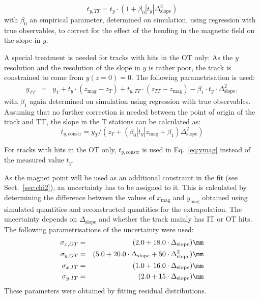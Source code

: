 \begin{equation}
t_{y,TT} = t_{y} \cdot (1 + \beta_{0} |t_{y}| \Delta_{\text{slope}}^{2})
\end{equation}
with  $\beta_{0}$ an empirical parameter, determined on simulation, 
using regression with true observables, to correct
for the effect of the bending in the magnetic field on the slope in $y$.

A special treatment is needed for tracks with hits in the OT only: As the
$y$ resolution and the resolution of the slope in $y$ is rather poor, the track
is constrained to come from $y(z=0) = 0$. The following parametrisation is used:
\begin{eqnarray}
y_{TT} & = & y_{T} + t_{y} \cdot (z_{\text{mag}} - z_{T}) + t_{y,TT} \cdot (z_{TT} - z_{\text{mag}}) - \beta_{1} \cdot t_{y} \cdot \Delta_{\text{slope}}^{2},
\end{eqnarray}
with $\beta_{1}$ again determined on simulation using regression with true observables. 
Assuming that no further correction is needed between the point of origin of the
track and TT, the slope in the T stations can be calculated as:
\begin{equation}
t_{y, \text{constr}} = y_{T} / ( z_{T} + (\beta_{0} |t_{y}| z_{\text{mag}} + \beta_{1} ) \Delta_{\text{slope}}^{2})
\end{equation}

For tracks with hits in the OT only, $t_{y, \text{constr}}$ is used in
Eq.~\ref{eq:ymag} instead of the measured value $t_{y}$.

As the magnet point will be used as an additional constraint in the \chisq fit
(see Sect.~\ref{sec:chi2}), an uncertainty has to be assigned to it. This is
calculated by determining the difference between the values of $x_{\text{mag}}$ and
$y_{\text{mag}}$ obtained using simulated quantities and reconstructed quantities for
the extrapolation. The uncertainty depends on $\Delta_{\text{slope}}$ and whether the track
mainly has IT or OT hits. The following parametrisations of the uncertainty
were used:
\begin{eqnarray}
\sigma_{x, OT} & = & (2.0 + 18.0\cdot \Delta_{\text{slope}})\mm \nonumber \\
\sigma_{y, OT} & = & (5.0 + 20.0\cdot \Delta_{\text{slope}} + 50\cdot \Delta_{\text{slope}}^{2})\mm  \nonumber \\
\sigma_{x, IT} & = & (1.0 + 16.0\cdot \Delta_{\text{slope}})\mm  \nonumber \\
\sigma_{y, IT} & = & (2.0 + 15\cdot \Delta_{\text{slope}})\mm  \nonumber
\end{eqnarray}
These parameters were obtained by fitting residual distributions.

